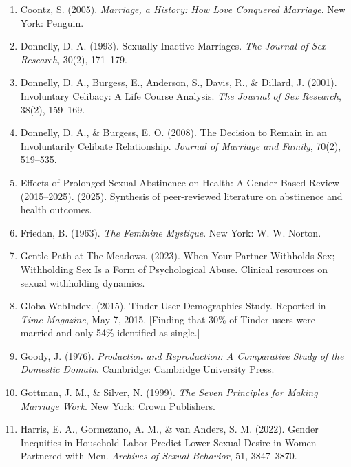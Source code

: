 \documentclass[12pt,openany]{book}
\numberwithin{equation}{chapter}
\begin{document}
\begin{enumerate}
    \item Coontz, S. (2005). \textit{Marriage, a History: How Love Conquered Marriage}. New York: Penguin.
    
    \item Donnelly, D. A. (1993). Sexually Inactive Marriages. \textit{The Journal of Sex Research}, 30(2), 171--179.
    
    \item Donnelly, D. A., Burgess, E., Anderson, S., Davis, R., \& Dillard, J. (2001). Involuntary Celibacy: A Life Course Analysis. \textit{The Journal of Sex Research}, 38(2), 159--169.
    
    \item Donnelly, D. A., \& Burgess, E. O. (2008). The Decision to Remain in an Involuntarily Celibate Relationship. \textit{Journal of Marriage and Family}, 70(2), 519--535.
    
    \item Effects of Prolonged Sexual Abstinence on Health: A Gender-Based Review (2015--2025). (2025). Synthesis of peer-reviewed literature on abstinence and health outcomes.
    
    \item Friedan, B. (1963). \textit{The Feminine Mystique}. New York: W. W. Norton.
    
    \item Gentle Path at The Meadows. (2023). When Your Partner Withholds Sex; Withholding Sex Is a Form of Psychological Abuse. Clinical resources on sexual withholding dynamics.
    
    \item GlobalWebIndex. (2015). Tinder User Demographics Study. Reported in \textit{Time Magazine}, May 7, 2015. [Finding that 30\% of Tinder users were married and only 54\% identified as single.]
    
    \item Goody, J. (1976). \textit{Production and Reproduction: A Comparative Study of the Domestic Domain}. Cambridge: Cambridge University Press.
    
    \item Gottman, J. M., \& Silver, N. (1999). \textit{The Seven Principles for Making Marriage Work}. New York: Crown Publishers.
    
    \item Harris, E. A., Gormezano, A. M., \& van Anders, S. M. (2022). Gender Inequities in Household Labor Predict Lower Sexual Desire in Women Partnered with Men. \textit{Archives of Sexual Behavior}, 51, 3847--3870.
    

\end{enumerate}
\end{document}
